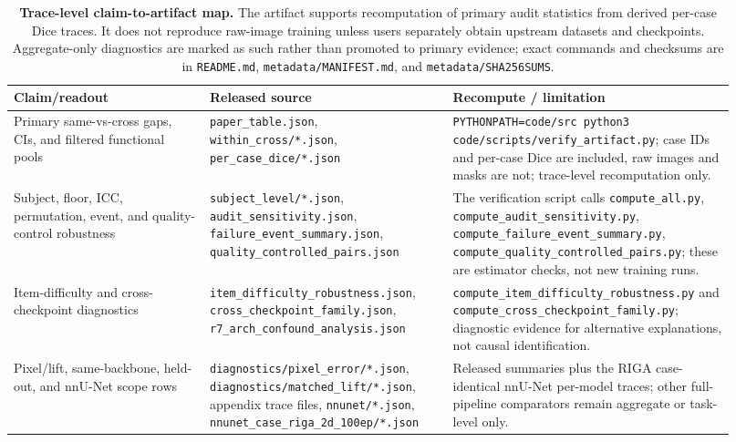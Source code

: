 \begin{table}[!htbp]
  \caption{\textbf{Trace-level claim-to-artifact map.} The artifact supports recomputation of primary audit statistics from derived per-case Dice traces. It does not reproduce raw-image training unless users separately obtain upstream datasets and checkpoints. Aggregate-only diagnostics are marked as such rather than promoted to primary evidence; exact commands and checksums are in \texttt{README.md}, \texttt{metadata/MANIFEST.md}, and \texttt{metadata/SHA256SUMS}.}
  \label{tab:claim-artifact-map}
  \centering\scriptsize
  \setlength{\tabcolsep}{3pt}
  \begin{tabular}{p{0.25\linewidth}p{0.31\linewidth}p{0.36\linewidth}}
    \toprule
    Claim/readout & Released source & Recompute / limitation \\
    \midrule
    Primary same-vs-cross gaps, CIs, and filtered functional pools &
    \texttt{paper\_table.json}, \texttt{within\_cross/*.json},
    \texttt{per\_case\_dice/*.json} &
    \texttt{PYTHONPATH=code/src python3 code/scripts/verify\_artifact.py}; case IDs and per-case Dice are included,
    raw images and masks are not; trace-level recomputation only. \\
    Subject, floor, ICC, permutation, event, and quality-control robustness &
    \texttt{subject\_level/*.json}, \texttt{audit\_sensitivity.json},
    \texttt{failure\_event\_summary.json}, \texttt{quality\_controlled\_pairs.json} &
    The verification script calls \texttt{compute\_all.py}, \texttt{compute\_audit\_sensitivity.py},
    \texttt{compute\_failure\_event\_summary.py},
    \texttt{compute\_quality\_controlled\_pairs.py}; these are estimator
    checks, not new training runs. \\
    Item-difficulty and cross-checkpoint diagnostics &
    \texttt{item\_difficulty\_robustness.json},
    \texttt{cross\_checkpoint\_family.json},
    \texttt{r7\_arch\_confound\_analysis.json} &
    \texttt{compute\_item\_difficulty\_robustness.py} and
    \texttt{compute\_cross\_checkpoint\_family.py}; diagnostic evidence for
    alternative explanations, not causal identification. \\
    Pixel/lift, same-backbone, held-out, and nnU-Net scope rows &
    \texttt{diagnostics/pixel\_error/*.json},
    \texttt{diagnostics/matched\_lift/*.json}, appendix trace files,
    \texttt{nnunet/*.json}, \texttt{nnunet\_case\_riga\_2d\_100ep/*.json} &
    Released summaries plus the RIGA case-identical nnU-Net per-model traces;
    other full-pipeline comparators remain aggregate or task-level only. \\
    \bottomrule
  \end{tabular}
\end{table}

